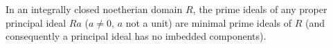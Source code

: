 In an integrally closed noetherian domain $R$, the prime ideals of any proper principal ideal $Ra$ ($a \neq 0$, $a$ not a unit) are minimal prime ideals of $R$ (and consequently a principal ideal has no imbedded components).
